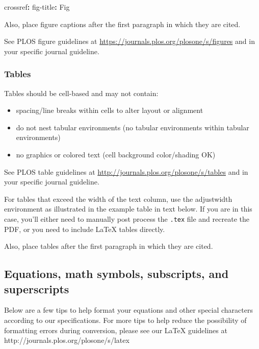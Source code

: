 \documentclass[
  10pt,
  letterpaper,
]{article}
\newenvironment{Shaded}{\begin{snugshade}}{\end{snugshade}}
\newcommand{\AttributeTok}[1]{\textcolor[rgb]{0.40,0.45,0.13}{#1}}
\newcommand{\FunctionTok}[1]{\textcolor[rgb]{0.28,0.35,0.67}{#1}}
\newcommand{\KeywordTok}[1]{\textcolor[rgb]{0.00,0.23,0.31}{\textbf{#1}}}
\providecommand{\tightlist}{%
  \setlength{\itemsep}{0pt}\setlength{\parskip}{0pt}}\usepackage{longtable,booktabs,array}
\begin{document}
\begin{Shaded}
\begin{Highlighting}[]
\FunctionTok{crossref}\KeywordTok{:}
\AttributeTok{  }\FunctionTok{fig{-}title}\KeywordTok{:}\AttributeTok{ Fig }
\end{Highlighting}
\end{Shaded}

Also, place figure captions after the first paragraph in which they are
cited.

See PLOS figure guidelines at
\url{https://journals.plos.org/plosone/s/figures} and in your specific
journal guideline.

\subsubsection{Tables}\label{tables}

Tables should be cell-based and may not contain:

\begin{itemize}
\tightlist
\item
  spacing/line breaks within cells to alter layout or alignment
\item
  do not nest tabular environments (no tabular environments within
  tabular environments)
\item
  no graphics or colored text (cell background color/shading OK)
\end{itemize}

See PLOS table guidelines at
\url{http://journals.plos.org/plosone/s/tables} and in your specific
journal guideline.

For tables that exceed the width of the text column, use the adjustwidth
environment as illustrated in the example table in text below. If you
are in this case, you'll either need to manually post process the
\texttt{.tex} file and recreate the PDF, or you need to include LaTeX
tables directly.

Also, place tables after the first paragraph in which they are cited.

\subsection{Equations, math symbols, subscripts, and
superscripts}\label{equations-math-symbols-subscripts-and-superscripts}

Below are a few tips to help format your equations and other special
characters according to our specifications. For more tips to help reduce
the possibility of formatting errors during conversion, please see our
LaTeX guidelines at http://journals.plos.org/plosone/s/latex
\end{document}
